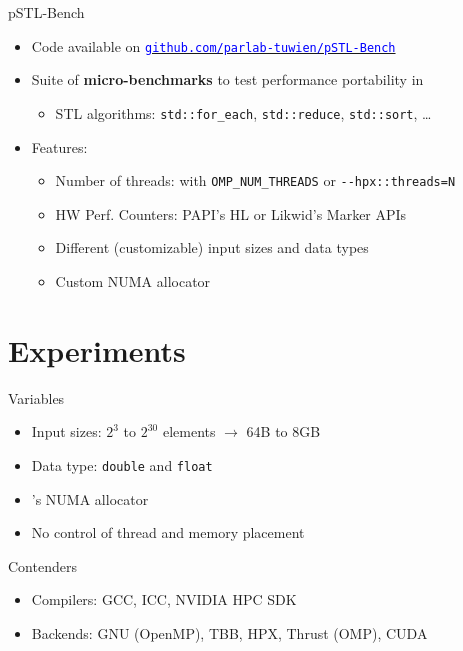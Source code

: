 \documentclass[aspectratio=169]{beamer}
\newenvironment{blockitem}[1]{\begin{block}{#1}\begin{itemize}}{\end{itemize}\end{block}}
\newenvironment{xframe}[1][]%
	{\begin{frame}[fragile, environment=xframe, #1]{\secname}}%
	{\end{frame}}
\newcommand{\colorref}[3][blue]{\href{#2}{\texttt{\textcolor{#1}{#3}}}}
\begin{document}
\begin{xframe}
	\begin{blockitem}{pSTL-Bench}
		\item Code available on \colorref{https://github.com/parlab-tuwien/pSTL-Bench}{github.com/parlab-tuwien/pSTL-Bench}
		\item Suite of \textbf{micro-benchmarks} to test performance portability in \langcpp
		\begin{itemize}
			\item STL algorithms: \verb|std::for_each|, \verb|std::reduce|, \verb|std::sort|, \dots
		\end{itemize}
		\item Features:
		\begin{itemize}
			\item Number of threads: with \verb|OMP_NUM_THREADS| or \verb|--hpx::threads=N|
			\item HW Perf. Counters: PAPI's HL or Likwid's Marker APIs
			\item Different (customizable) input sizes and data types
			\item Custom NUMA allocator
		\end{itemize}
	\end{blockitem}
\end{xframe}

\section*{Experiments}

\begin{xframe}
	\begin{blockitem}{Variables}
		\item Input sizes: $2^{3}$ to $2^{30}$ elements $\rightarrow$ 64B to 8GB
		\item Data type: \verb|double| and \verb|float|
		\item \pstlbench's NUMA allocator
		\item No control of thread and memory placement
	\end{blockitem}
	\begin{blockitem}{Contenders}
		\item Compilers: GCC, ICC, NVIDIA HPC SDK
		\item Backends: GNU (OpenMP), TBB, HPX, Thrust (OMP), CUDA
	\end{blockitem}
\end{xframe}

\begin{xframe}
	
\end{xframe}
\end{document}
